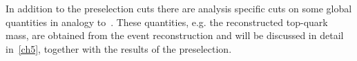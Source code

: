  In addition to the preselection cuts there are analysis specific cuts on some global quantities in analogy to~\cite{ATLAS-CONF-2017-071}. These quantities, e.g. the reconstructed top-quark mass, are obtained  from the event reconstruction and will be discussed in detail in~\cref{ch5}, together with the results of the preselection.





















\clearpage
